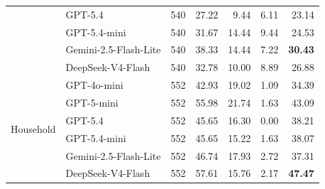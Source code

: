 \begin{table}[t]
{\begin{tabular}{llrrrrr}
  & GPT-5.4                 & 540 & 27.22 &  9.44 &  6.11 & 23.14 \\
  & GPT-5.4-mini            & 540 & 31.67 & 14.44 &  9.44 & 24.53 \\
  & Gemini-2.5-Flash-Lite   & 540 & 38.33 & 14.44 &  7.22 & \textbf{30.43} \\
  & DeepSeek-V4-Flash       & 540 & 32.78 & 10.00 &  8.89 & 26.88 \\
\midrule
\multirow{6}{*}{Household}
  & GPT-4o-mini             & 552 & 42.93 & 19.02 & 1.09 & 34.39 \\
  & GPT-5-mini              & 552 & 55.98 & 21.74 & 1.63 & 43.09 \\
  & GPT-5.4                 & 552 & 45.65 & 16.30 & 0.00 & 38.21 \\
  & GPT-5.4-mini            & 552 & 45.65 & 15.22 & 1.63 & 38.07 \\
  & Gemini-2.5-Flash-Lite   & 552 & 46.74 & 17.93 & 2.72 & 37.31 \\
  & DeepSeek-V4-Flash       & 552 & 57.61 & 15.76 & 2.17 & \textbf{47.47} \\
\bottomrule
\end{tabular}%
}
\end{table}

